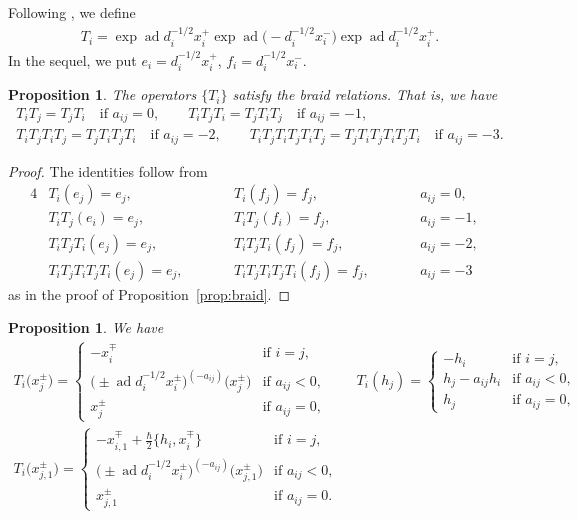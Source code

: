 \documentclass[pdftex]{sigma}
\newtheorem{prop}[thm]{Proposition}
\theoremstyle{definition}
\numberwithin{equation}{section}
\DeclareMathOperator{\ad}{ad}
\begin{document}
Following \cite{MR3861718}, we define
\begin{gather*}
T_i = \exp\ad d_i^{-1/2}x_i^+ \exp\ad \big({-}d_i^{-1/2}x_i^-\big) \exp\ad d_i^{-1/2}x_i^+.
\end{gather*}
In the sequel, we put $e_i = d_i^{-1/2}x_i^+$, $f_i=d_i^{-1/2}x_i^-$.
\begin{prop}
The operators $\{T_i\}$ satisfy the braid relations. That is, we have
\begin{gather*}
T_i T_j = T_j T_i \quad \text{if $a_{ij}=0$},\qquad T_i T_j T_i = T_j T_i T_j \quad \text{if $a_{ij}=-1$},\\
T_i T_j T_i T_j = T_j T_i T_j T_i \quad \text{if $a_{ij}=-2$},\qquad T_i T_j T_i T_j T_i T_j = T_j T_i T_j T_i T_j T_i \quad \text{if $a_{ij}=-3$}.
\end{gather*}
\end{prop}
\begin{proof}The identities follow from
\begin{alignat*}{4}
& T_i(e_j) = e_j, \qquad && T_i(f_j) = f_j, \qquad && a_{ij}=0,& \\
& T_i T_j (e_i) = e_j, \qquad && T_i T_j (f_i) = f_j, \qquad && a_{ij}=-1,& \\
& T_i T_j T_i (e_j) = e_j, \qquad && T_i T_j T_i (f_j) = f_j, \qquad && a_{ij}=-2,& \\
& T_i T_j T_i T_j T_i (e_j) = e_j, \qquad && T_i T_j T_i T_j T_i (f_j) = f_j, \qquad && a_{ij}=-3 &
\end{alignat*}
as in the proof of Proposition~\ref{prop:braid}.
\end{proof}

\begin{prop}We have
\begin{gather*}
T_i\big(x_j^{\pm}\big) = \begin{cases}
-x_i^{\mp} & \text{if $i=j$},\\
\big({\pm} \ad d_i^{-1/2}x_i^{\pm}\big)^{(-a_{ij})}\big(x_j^{\pm}\big) & \text{if $a_{ij}<0$},\\
x_j^{\pm} & \text{if $a_{ij}=0$},
\end{cases}\qquad
T_i(h_j) = \begin{cases}
-h_i & \text{if $i=j$},\\
h_j - a_{ij} h_i & \text{if $a_{ij}<0$},\\
h_j & \text{if $a_{ij}=0$},
\end{cases}
\\
T_i\big(x_{j,1}^{\pm}\big) = \begin{cases}
-x_{i,1}^{\mp} + \tfrac{\hbar}{2}\big\{ h_i, x_i^{\mp} \big\} & \text{if $i=j$},\\
\big({\pm} \ad d_i^{-1/2} x_i^{\pm}\big)^{(-a_{ij})}\big(x_{j,1}^{\pm}\big) & \text{if $a_{ij} <0 $},\\
x_{j,1}^{\pm} & \text{if $a_{ij}=0$}.
\end{cases}
\end{gather*}
\end{prop}
\end{document}
